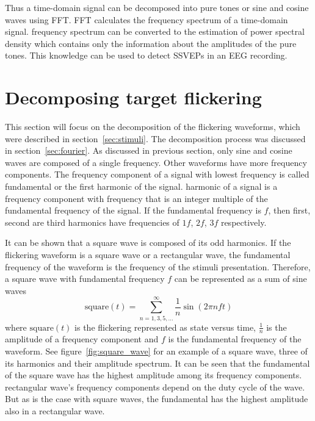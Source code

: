 Thus a time-domain signal can be decomposed into \glspl{pure tone} or sine and cosine waves using \gls{FFT}. \gls{FFT} calculates the \gls{frequency spectrum} of a time-domain signal. \Gls{frequency spectrum} can be converted to the estimation of \gls{power spectral density} which contains only the information about the amplitudes of the \glspl{pure tone}. This knowledge can be used to detect \glspl{SSVEP} in an \gls{EEG} recording.



\section{Decomposing target flickering}
\label{sec:decomposition}

This section will focus on the decomposition of the \glspl{flickering waveform}, which were described in section~\ref{sec:stimuli}. The decomposition process was discussed in section~\ref{sec:fourier}. As discussed in previous section, only sine and cosine waves are composed of a single frequency. Other waveforms have more \glspl{frequency component}. The \gls{frequency component} of a signal with lowest frequency is called \gls{fundamental} or the first \gls{harmonic} of the signal. \Gls{harmonic} of a signal is a \gls{frequency component} with frequency that is an integer multiple of the \gls{fundamental} frequency of the signal. If the \gls{fundamental} frequency is $f$, then first, second are third \glspl{harmonic} have frequencies of $1f$, $2f$, $3f$ respectively.

It can be shown that a \gls{square wave} is composed of its odd \glspl{harmonic}. If the \gls{flickering waveform} is a \gls{square wave} or a \gls{rectangular wave}, the \gls{fundamental} frequency of the waveform is the frequency of the stimuli presentation. Therefore, a \gls{square wave} with \gls{fundamental} frequency $f$ can be represented as a sum of sine waves
\begin{equation}
	\label{eq:square}
	\mbox{square}(t) = \sum_{n=1,3,5,\dots}^{\infty}\frac{1}{n} \sin(2\pi nft)
\end{equation}
where $\mbox{square}(t)$ is the \gls{flickering} represented as \gls{state} versus time, $\frac{1}{n}$ is the amplitude of a \gls{frequency component} and $f$ is the \gls{fundamental} frequency of the waveform. See figure~\ref{fig:square_wave} for an example of a \gls{square wave}, three of its \glspl{harmonic} and their amplitude spectrum. It can be seen that the \gls{fundamental} of the square wave has the highest amplitude among its \glspl{frequency component}. \Gls{rectangular wave}'s \glspl{frequency component} depend on the \gls{duty cycle} of the wave. But as is the case with \glspl{square wave}, the \gls{fundamental} has the highest amplitude also in a \gls{rectangular wave}.

